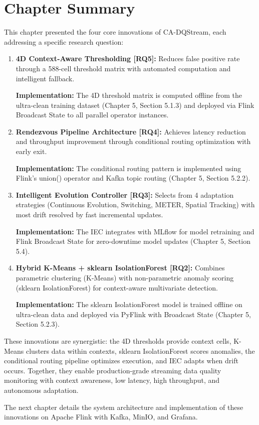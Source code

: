 \section{Chapter Summary}

This chapter presented the four core innovations of CA-DQStream, each addressing a specific research question:

\begin{enumerate}
    \item \textbf{4D Context-Aware Thresholding [RQ5]:} Reduces false positive rate through a 588-cell threshold matrix with automated computation and intelligent fallback.

        \textbf{Implementation:} The 4D threshold matrix is computed offline from the ultra-clean training dataset (Chapter 5, Section 5.1.3) and deployed via Flink Broadcast State to all parallel operator instances.

    \item \textbf{Rendezvous Pipeline Architecture [RQ4]:} Achieves latency reduction and throughput improvement through conditional routing optimization with early exit.

        \textbf{Implementation:} The conditional routing pattern is implemented using Flink's union() operator and Kafka topic routing (Chapter 5, Section 5.2.2).

    \item \textbf{Intelligent Evolution Controller [RQ3]:} Selects from 4 adaptation strategies (Continuous Evolution, Switching, METER, Spatial Tracking) with most drift resolved by fast incremental updates.

        \textbf{Implementation:} The IEC integrates with MLflow for model retraining and Flink Broadcast State for zero-downtime model updates (Chapter 5, Section 5.4).

    \item \textbf{Hybrid K-Means + sklearn IsolationForest [RQ2]:} Combines parametric clustering (K-Means) with non-parametric anomaly scoring (sklearn IsolationForest) for context-aware multivariate detection.

        \textbf{Implementation:} The sklearn IsolationForest model is trained offline on ultra-clean data and deployed via PyFlink with Broadcast State (Chapter 5, Section 5.2.3).
\end{enumerate}

            These innovations are synergistic: the 4D thresholds provide context cells, K-Means clusters data within contexts, sklearn IsolationForest scores anomalies, the conditional routing pipeline optimizes execution, and IEC adapts when drift occurs. Together, they enable production-grade streaming data quality monitoring with context awareness, low latency, high throughput, and autonomous adaptation.

The next chapter details the system architecture and implementation of these innovations on Apache Flink with Kafka, MinIO, and Grafana.
